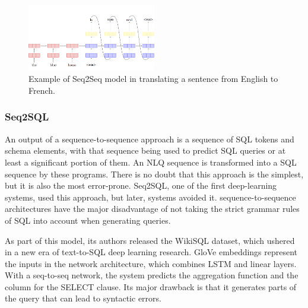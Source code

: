 \begin{figure}[ht]
    \centering
    \includegraphics[width=0.5\textwidth]{pics/seq2seq.png}
    \caption{Example of Seq2Seq model in translating a sentence from English to French.}
    \label{fig:seq2seq}
\end{figure}

\subsubsection{Seq2SQL}

An output of a sequence-to-sequence approach is a sequence of SQL tokens and schema elements, with that sequence being used to predict SQL queries or at least a significant portion of them. An NLQ sequence is transformed into a SQL sequence by these programs. There is no doubt that this approach is the simplest, but it is also the most error-prone. Seq2SQL\cite{zhong_seq2sql_2017}, one of the first deep-learning systems, used this approach, but later, systems avoided it. sequence-to-sequence architectures have the major disadvantage of not taking the strict grammar rules of SQL into account when generating queries.

As part of this model, its authors released the WikiSQL dataset, which ushered in a new era of text-to-SQL deep learning research. GloVe embeddings represent the inputs in the network architecture, which combines LSTM and linear layers. With a seq-to-seq network, the system predicts the aggregation function and the column for the SELECT clause. Its major drawback is that it generates parts of the query that can lead to syntactic errors.